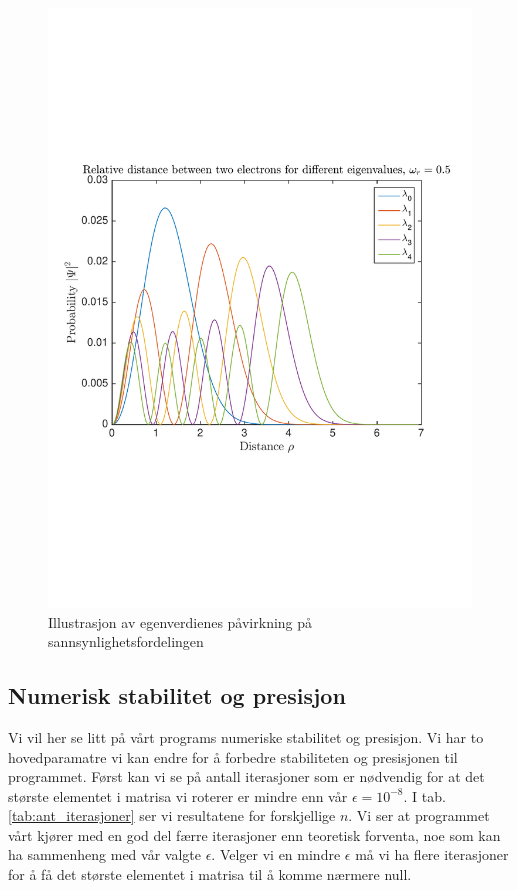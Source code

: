 \documentclass[norsk, 12pt]{article}
\theoremstyle{definition} \newtheorem{defi}{Definisjon}[subsection]
\theoremstyle{definition} \newtheorem{teo}{Teorem}[subsection]
\theoremstyle{definition} \newtheorem*{eks}{Eksempel}
\begin{document}
\begin{figure}[H]
\centering
\includegraphics[scale = 0.6, trim = 1cm 7cm 1cm 7cm]{TEC_different_eigenvalues_05.pdf}
\caption{Illustrasjon av egenverdienes påvirkning på sannsynlighetsfordelingen}
\label{fig:eig}
\end{figure}

\subsection*{Numerisk stabilitet og presisjon}
Vi vil her se litt på vårt programs numeriske stabilitet og presisjon. Vi har to hovedparamatre vi kan endre for å forbedre stabiliteten og presisjonen til programmet. Først kan vi se på antall iterasjoner som er nødvendig for at det største elementet i matrisa vi roterer er mindre enn vår $\epsilon = 10^{-8}$. I tab. \ref{tab:ant_iterasjoner} ser vi resultatene for forskjellige $n$. Vi ser at programmet vårt kjører med en god del færre iterasjoner enn teoretisk forventa, noe som kan ha sammenheng med vår valgte $\epsilon$. Velger vi en mindre $\epsilon$ må vi ha flere iterasjoner for å få det største elementet i matrisa til å komme nærmere null.
\end{document}
